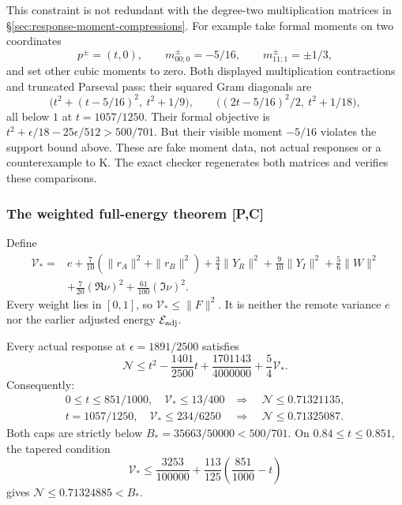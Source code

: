 This constraint is not redundant with the degree-two multiplication
matrices in \S\ref{sec:response-moment-compressions}. For example take
formal moments on two coordinates
\[
 p^\pm=(t,0),\qquad m^\pm_{00;0}=-5/16,\qquad
 m^\pm_{11;1}=\pm1/3,
\]
and set other cubic moments to zero. Both displayed multiplication
contractions and truncated Parseval pass: their squared Gram diagonals are
\[
 \bigl(t^2+(t-5/16)^2,\ t^2+1/9\bigr),\qquad
 \bigl((2t-5/16)^2/2,\ t^2+1/18\bigr),
\]
all below $1$ at $t=1057/1250$. Their formal objective is
$t^2+\epsilon/18-25\epsilon/512>500/701$.
But their visible moment $-5/16$ violates the support bound above.
These are fake moment data, not actual responses or a counterexample to K.
The exact checker regenerates both matrices and verifies these comparisons.

\subsubsection{The weighted full-energy theorem [P,C]}
Define
\begin{equation}\label{eq:weighted-full-energy-definition}
\begin{aligned}
 \mathcal V_*={}&e+\frac7{10}(\|r_A\|^2+\|r_B\|^2)
  +\frac34\|Y_R\|^2+\frac9{10}\|Y_I\|^2+\frac56\|W\|^2\\
 &+\frac7{20}(\Re\nu)^2+\frac{61}{100}(\Im\nu)^2.
\end{aligned}
\end{equation}
Every weight lies in $[0,1]$, so $\mathcal V_*\le\|F\|^2$.
It is neither the remote variance $e$ nor the earlier adjusted energy
$\mathcal E_{\rm adj}$.

\begin{theorem}
\label{thm:weighted-full-energy-response}
Every actual response at $\epsilon=1891/2500$ satisfies
\begin{equation}\label{eq:weighted-full-energy-cap}
 \boxed{\quad
 \mathcal N\le t^2-\frac{1401}{2500}t
              +\frac{1701143}{4000000}+\frac54\mathcal V_*.
 \quad}
\end{equation}
Consequently:
\begin{align}
 0\le t\le851/1000,\quad\mathcal V_*\le13/400
 &\Longrightarrow\quad\mathcal N\le0.71321135,
 \label{eq:weighted-full-energy-strip}\\
 t=1057/1250,\quad\mathcal V_*\le234/6250
 &\Longrightarrow\quad\mathcal N\le0.71325087.
 \label{eq:weighted-full-energy-peak}
\end{align}
Both caps are strictly below $B_*=35663/50000<500/701$.
On $0.84\le t\le0.851$, the tapered condition
\begin{equation}\label{eq:weighted-full-energy-taper}
 \mathcal V_*\le\frac{3253}{100000}
                +\frac{113}{125}\left(\frac{851}{1000}-t\right)
\end{equation}
gives $\mathcal N\le0.71324885<B_*$.
\end{theorem}

